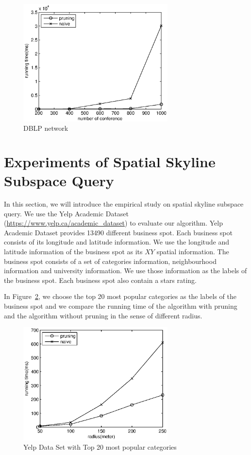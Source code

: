 \begin{figure}[H]
    \centering
      \includegraphics[width=0.7\textwidth]{figs/DBLP}
    \caption{DBLP network}
    \label{fig:exp:dblp}
\end{figure}

\section{Experiments of Spatial Skyline Subspace Query}
\label{ch:exp:spatial}
In this section, we will introduce the empirical study on spatial skyline subspace query. We use the Yelp Academic Dataset (\url{https://www.yelp.ca/academic_dataset}) to evaluate our algorithm. Yelp Academic Dataset provides 13490 different business spot. Each business spot consists of its longitude and latitude information. We use the longitude and latitude information of the business spot as its $XY$ spatial information. The business spot consists of a set of categories information, neighbourhood information and university information. We use those information as the labels of the business spot. Each business spot also contain a stars rating.

In Figure~\ref{fig:exp:yelp20l}, we choose the top 20 most popular categories as the labels of the business spot and we compare the running time of the algorithm with pruning and the algorithm without pruning in the sense of different radius.

\begin{figure}[h]
    \centering
      \includegraphics[width=0.7\textwidth]{figs/YelpTop20Labels}
    \caption{Yelp Data Set with Top 20 most popular categories}
    \label{fig:exp:yelp20l}
\end{figure}

